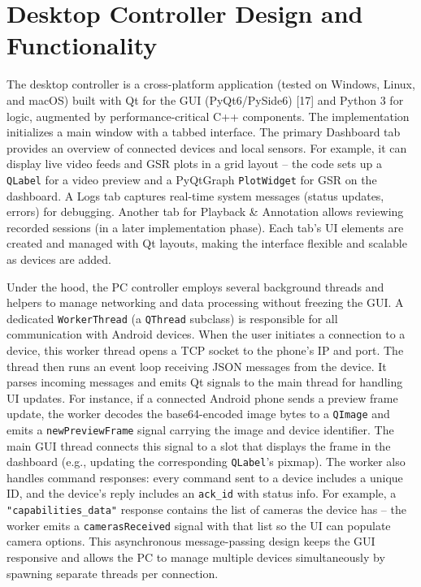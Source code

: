 \section{Desktop Controller Design and Functionality}\label{sec:4-3}
The desktop controller is a cross-platform application (tested on Windows, Linux, and macOS) built with Qt for the GUI (PyQt6/PySide6) [17] and Python 3 for logic, augmented by performance-critical C++ components. The implementation initializes a main window with a tabbed interface. The primary Dashboard tab provides an overview of connected devices and local sensors. For example, it can display live video feeds and GSR plots in a grid layout -- the code sets up a \texttt{QLabel} for a video preview and a PyQtGraph \texttt{PlotWidget} for GSR on the dashboard. A Logs tab captures real-time system messages (status updates, errors) for debugging. Another tab for Playback \& Annotation allows reviewing recorded sessions (in a later implementation phase). Each tab's UI elements are created and managed with Qt layouts, making the interface flexible and scalable as devices are added.

Under the hood, the PC controller employs several background threads and helpers to manage networking and data processing without freezing the GUI. A dedicated \texttt{WorkerThread} (a \texttt{QThread} subclass) is responsible for all communication with Android devices. When the user initiates a connection to a device, this worker thread opens a TCP socket to the phone's IP and port. The thread then runs an event loop receiving JSON messages from the device. It parses incoming messages and emits Qt signals to the main thread for handling UI updates. For instance, if a connected Android phone sends a preview frame update, the worker decodes the base64-encoded image bytes to a \texttt{QImage} and emits a \texttt{newPreviewFrame} signal carrying the image and device identifier. The main GUI thread connects this signal to a slot that displays the frame in the dashboard (e.g., updating the corresponding \texttt{QLabel}'s pixmap). The worker also handles command responses: every command sent to a device includes a unique ID, and the device's reply includes an \texttt{ack\_id} with status info. For example, a \texttt{"capabilities\_data"} response contains the list of cameras the device has -- the worker emits a \texttt{camerasReceived} signal with that list so the UI can populate camera options. This asynchronous message-passing design keeps the GUI responsive and allows the PC to manage multiple devices simultaneously by spawning separate threads per connection.

